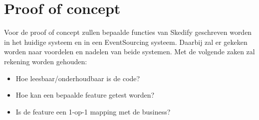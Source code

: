 \section{Proof of concept}
\label{sec:proof-of-concept}

Voor de proof of concept zullen bepaalde functies van Skedify geschreven worden in het huidige systeem en in een EventSourcing systeem. Daarbij zal er gekeken worden naar voordelen en nadelen van beide systemen. Met de volgende zaken zal rekening worden gehouden:

\begin{itemize}
  \item{Hoe leesbaar/onderhoudbaar is de code?}
  \item{Hoe kan een bepaalde feature getest worden?}
  \item{Is de feature een 1-op-1 mapping met de business?}
\end{itemize}

